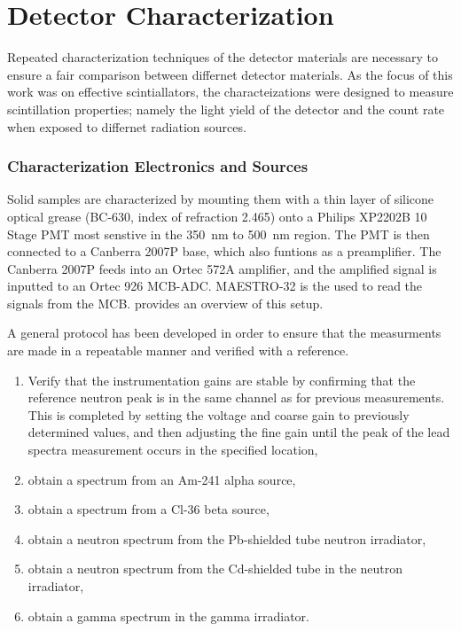 \chapter{Detector Characterization}
\label{chap:DetChar}
Repeated characterization techniques of the detector materials are necessary to ensure a fair comparison between differnet detector materials.
As the focus of this work was on effective scintiallators, the characteizations were designed to measure scintillation properties; namely the light yield of the detector and the count rate when exposed to differnet radiation sources.

\subsection{Characterization Electronics and Sources}
Solid samples are characterized by mounting them with a thin layer of silicone optical grease (BC-630, index of refraction 2.465) onto a Philips XP2202B 10 Stage PMT most senstive in the \SI{350}{\nm} to \SI{500}{\nm} region.
The PMT is then connected to a Canberra 2007P base, which also funtions as a preamplifier.
The Canberra 2007P feeds into an Ortec 572A amplifier, and the amplified signal is inputted to an Ortec 926 MCB-ADC.
MAESTRO-32 is the used to read the signals from the MCB.
 provides an overview of this setup.
\begin{figure}
  \label{fig:ElectronicSetup}
\end{figure}
A general protocol has been developed in order to ensure that the measurments are made in a repeatable manner and verified with a reference.
\begin{enumerate}
  \item Verify that the instrumentation gains are stable by confirming that the reference neutron peak is in the same channel as for previous measurements. This is completed by setting the voltage and coarse gain to previously determined values, and then adjusting the fine gain until the peak of the lead spectra measurement occurs in the specified location,
  \item obtain a spectrum from an Am-241 alpha source,
  \item obtain a spectrum from a Cl-36 beta source,
  \item obtain a neutron spectrum from the Pb-shielded tube neutron irradiator,
  \item obtain a neutron spectrum from the Cd-shielded tube in the neutron irradiator,
  \item obtain a gamma spectrum in the gamma irradiator.
\end{enumerate}

